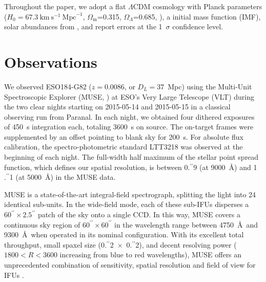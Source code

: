 \documentclass[traditabstract, referee]{aa}
\newcommand{\farc}{\hbox{$.\!\!^{\prime\prime}$}}
\begin{document}
Throughout the paper, we adopt a flat $\Lambda$CDM cosmology with Planck parameters ($H_0=67.3~\mathrm{km}~\mathrm{s}^{-1}~\mathrm{Mpc}^{-1}$, $\Omega_\mathrm{m}$=0.315, $\Omega_\Lambda$=0.685, \citealt{2014A&A...571A..16P}), a \citet{2003PASP..115..763C} initial mass function (IMF), solar abundances from \citet{2009ARA&A..47..481A}, and report errors at the 1~$\sigma$ confidence level.

\section{Observations}

We observed ESO184-G82 ($z=0.0086$, or $D_L=37$~Mpc) using the Multi-Unit Spectroscopic Explorer (MUSE, \citealp{2010SPIE.7735E..08B}) at ESO's Very Large Telescope (VLT) during the two clear nights starting on 2015-05-14 and 2015-05-15 in a classical observing run from Paranal. In each night, we obtained four dithered exposures of 450~s integration each, totaling 3600~s on source. The on-target frames were supplemented by an offset pointing to blank sky for 200~s. For absolute flux calibration, the spectro-photometric standard LTT3218 was observed at the beginning of each night. The full-width half maximum of the stellar point spread function, which defines our spatial resolution, is between 0\farc{9} (at 9000~\AA) and 1\farc{1} (at 5000~\AA) in the MUSE data.

MUSE is a state-of-the-art integral-field spectrograph, splitting the light into 24 identical sub-units. In the wide-field mode, each of these sub-IFUs disperses a $60^{\prime\prime}\times 2.5^{\prime\prime}$ patch of the sky onto a single CCD. In this way, MUSE covers a continuous sky region of $60^{\prime\prime}\times 60^{\prime\prime}$ in the wavelength range between 4750~\AA~and 9300~\AA~when operated in its nominal configuration. With its excellent total throughput, small spaxel size (0\farc{2}~$\times$~0\farc{2}), and decent resolving power ($1800 < R < 3600$ increasing from blue to red wavelengths), MUSE offers an unprecedented combination of sensitivity, spatial resolution and field of view for IFUs \citep{2010SPIE.7735E..08B}.
\end{document}
